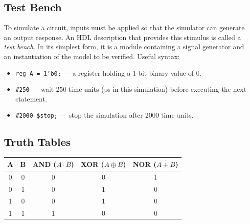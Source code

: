 \subsection*{Test Bench}
To simulate a circuit, inputs must be applied so that the simulator can generate an output response. An HDL description that provides this stimulus is called a \textit{test bench}. In its simplest form, it is a module containing a signal generator and an instantiation of the model to be verified. Useful syntax:
\begin{itemize}[leftmargin=*]
    \item \texttt{reg A = 1'b0;} --- a register holding a 1-bit binary value of 0.
    \item \texttt{\#250} --- wait 250 time units (ps in this simulation) before executing the next statement.
    \item \texttt{\#2000 \$stop;} --- stop the simulation after 2000 time units.
\end{itemize}

\subsection*{Truth Tables}
\begin{table}[H]
\centering
\small
\begin{tabular}{c c | c c c}
\toprule
\textbf{A} & \textbf{B} & \textbf{AND} ($A \cdot B$) & \textbf{XOR} ($A \oplus B$) & \textbf{NOR} ($\overline{A + B}$) \\
\midrule
0 & 0 & 0 & 0 & 1 \\
0 & 1 & 0 & 1 & 0 \\
1 & 0 & 0 & 1 & 0 \\
1 & 1 & 1 & 0 & 0 \\
\bottomrule
\end{tabular}
\end{table}
